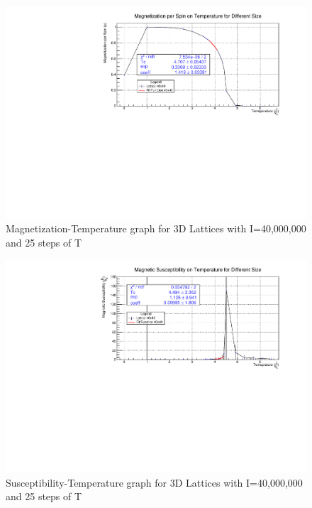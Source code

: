 \documentclass[11pt,a4paper]{article}
\begin{document}
\begin{figure}[h!]
  \centering
  \includegraphics[width=\columnwidth]{img/3d/c2.pdf}
  \caption{Magnetization-Temperature graph for 3D Lattices with I=40,000,000 and 25 steps of T}
\end{figure}

\begin{figure}[h!]
  \centering
  \includegraphics[width=\columnwidth]{img/3d/c3.pdf}
  \caption{Susceptibility-Temperature graph for 3D Lattices with I=40,000,000 and 25 steps of T}
\end{figure}
\end{document}
